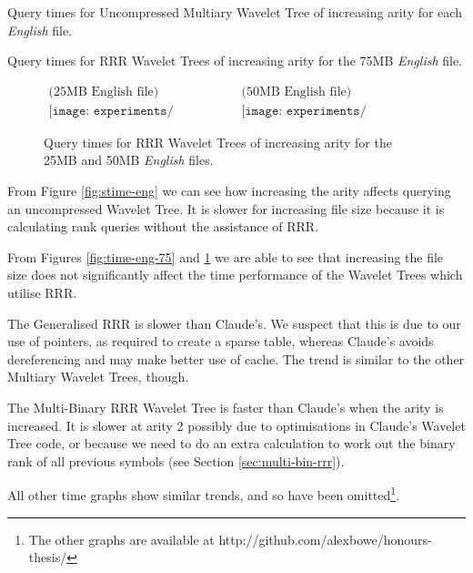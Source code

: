 \clearpage
			{Query times for Uncompressed Multiary Wavelet Tree 
			of increasing arity for each \emph{English} file.}
		
			{Query times for RRR Wavelet Trees of increasing arity
			for the 75MB \emph{English} file.}
	
			\begin{figure}[h]
			\begin{center}
			$\begin{array}{cc}
			\mbox{(25MB English file)} & 
			\mbox{(50MB English file)} \\
			\texttt{[image: experiments/time\_english\_25MB]} &
			\texttt{[image: experiments/time\_english\_50MB]}
			\end{array}$
			\end{center}
			\caption{Query times for RRR Wavelet Trees of increasing arity
			for the 25MB and 50MB \emph{English} files.}
			\label{fig:time-eng-25-50}
			\end{figure}
			
From Figure \ref{fig:stime-eng} we can see how increasing the arity affects
querying an uncompressed Wavelet Tree. It is slower for increasing file size
because it is calculating rank queries without the assistance of RRR.

From Figures \ref{fig:time-eng-75} and \ref{fig:time-eng-25-50} we are able 
to see that increasing the file size does not significantly affect the time
performance of the Wavelet Trees which utilise RRR.

The Generalised RRR is slower than Claude's. We suspect that this is due to our 
use of pointers, as required to create a sparse table, whereas Claude's avoids 
dereferencing and may make better use of cache. The trend is similar to the
other Multiary Wavelet Trees, though.

The Multi-Binary RRR Wavelet Tree is faster than Claude's when the arity is 
increased. It is slower at arity 2 possibly due to optimisations in Claude's
Wavelet Tree code, or because we need to do an extra calculation to work out
the binary rank of all previous symbols (see Section 
\ref{sec:multi-bin-rrr}).

All other time graphs show similar trends, and so have been omitted\footnote{The 
other graphs are available at http://github.com/alexbowe/honours-thesis/}.

